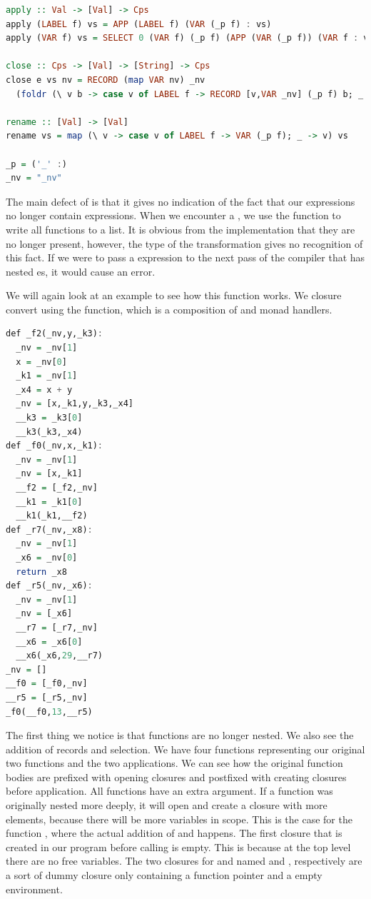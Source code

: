{\begin{lstlisting}[language=Haskell]
apply :: Val -> [Val] -> Cps
apply (LABEL f) vs = APP (LABEL f) (VAR (_p f) : vs)
apply (VAR f) vs = SELECT 0 (VAR f) (_p f) (APP (VAR (_p f)) (VAR f : vs))

close :: Cps -> [Val] -> [String] -> Cps
close e vs nv = RECORD (map VAR nv) _nv
  (foldr (\ v b -> case v of LABEL f -> RECORD [v,VAR _nv] (_p f) b; _ -> b) e vs)

rename :: [Val] -> [Val]
rename vs = map (\ v -> case v of LABEL f -> VAR (_p f); _ -> v) vs

_p = ('_' :)
_nv = "_nv"
\end{lstlisting}

The main defect of  is that it gives no indication of the fact that our  expressions no longer contain  expressions. When we encounter a , we use the  function to write all functions to a list. It is obvious from the implementation that they are no longer present, however, the type of the transformation gives no recognition of this fact. If we were to pass a  expression to the next pass of the compiler that has nested es, it would cause an error.

We will again look at an example to see how this function works. We closure convert  using the  function, which is a composition of  and monad handlers.

\begin{lstlisting}[language=Haskell]
def _f2(_nv,y,_k3):
  _nv = _nv[1]
  x = _nv[0]
  _k1 = _nv[1]
  _x4 = x + y
  _nv = [x,_k1,y,_k3,_x4]
  __k3 = _k3[0]
  __k3(_k3,_x4)
def _f0(_nv,x,_k1):
  _nv = _nv[1]
  _nv = [x,_k1]
  __f2 = [_f2,_nv]
  __k1 = _k1[0]
  __k1(_k1,__f2)
def _r7(_nv,_x8):
  _nv = _nv[1]
  _x6 = _nv[0]
  return _x8
def _r5(_nv,_x6):
  _nv = _nv[1]
  _nv = [_x6]
  __r7 = [_r7,_nv]
  __x6 = _x6[0]
  __x6(_x6,29,__r7)
_nv = []
__f0 = [_f0,_nv]
__r5 = [_r5,_nv]
_f0(__f0,13,__r5)
\end{lstlisting}

The first thing we notice is that functions are no longer nested. We also see the addition of records and selection. We have four functions representing our original two functions and the two applications. We can see how the original function bodies are prefixed with opening closures and postfixed with creating closures before application. All functions have an extra  argument. If a function was originally nested more deeply, it will open and create a closure with more elements, because there will be more variables in scope. This is the case for the function , where the actual addition of  and  happens. The first closure that is created in our program before calling  is empty. This is because at the top level there are no free variables. The two closures for  and  named  and , respectively are a sort of dummy closure only containing a function pointer and a empty environment.

}

